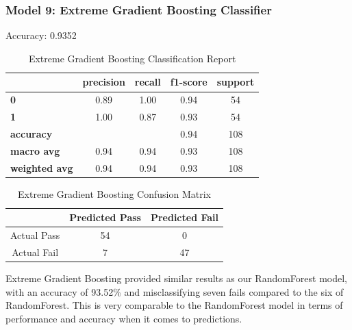\documentclass[11pt,a4paper]{article}
\begin{document}
\subsubsection{Model 9: Extreme Gradient Boosting Classifier}
Accuracy: 0.9352
\begin{table}[H]
    \centering
    \begin{tabular}{lcccc}
        \hline
        & \textbf{precision} & \textbf{recall} & \textbf{f1-score} & \textbf{support} \\
        \hline
        \textbf{0} & 0.89 & 1.00 & 0.94 & 54 \\
        \textbf{1} & 1.00 & 0.87 & 0.93 & 54 \\
        \hline
        \textbf{accuracy} & & & 0.94 & 108 \\
        \textbf{macro avg} & 0.94 & 0.94 & 0.93 & 108 \\
        \textbf{weighted avg} & 0.94 & 0.94 & 0.93 & 108 \\
        \hline
    \end{tabular}
    \caption{Extreme Gradient Boosting Classification Report}
    \label{tab:xgbclassification_report}
\end{table}
\begin{table}[H]
    \centering
    \begin{tabular}{|c|c|c|}
        \hline
        & Predicted Pass & Predicted Fail \\ \hline
        Actual Pass & 54 & 0 \\ \hline
        Actual Fail& 7 & 47 \\ \hline
    \end{tabular}
    \caption{Extreme Gradient Boosting Confusion Matrix}
    \label{tab:xgbconfusion_matrix}
\end{table}
Extreme Gradient Boosting provided similar results as our RandomForest model, with an accuracy of 93.52\% and misclassifying seven fails compared to the six of RandomForest. This is very comparable to the RandomForest model in terms of performance and accuracy when it comes to predictions.
\end{document}
